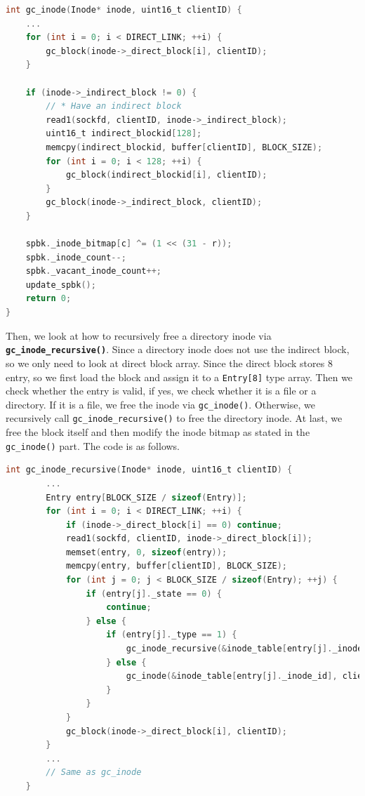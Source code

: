 \begin{lstlisting}[language=C]
int gc_inode(Inode* inode, uint16_t clientID) {
    ... 
    for (int i = 0; i < DIRECT_LINK; ++i) {
        gc_block(inode->_direct_block[i], clientID);
    }

    if (inode->_indirect_block != 0) {
        // * Have an indirect block
        read1(sockfd, clientID, inode->_indirect_block);
        uint16_t indirect_blockid[128];
        memcpy(indirect_blockid, buffer[clientID], BLOCK_SIZE);
        for (int i = 0; i < 128; ++i) {
            gc_block(indirect_blockid[i], clientID);
        }
        gc_block(inode->_indirect_block, clientID);        
    }

    spbk._inode_bitmap[c] ^= (1 << (31 - r));
    spbk._inode_count--;
    spbk._vacant_inode_count++;
    update_spbk();
    return 0;
}
\end{lstlisting}

Then, we look at how to recursively free a directory inode via \textbf{\texttt{gc_inode_recursive()}}. Since
 a directory inode does not use the indirect block, so we only need to look at direct block array. 
Since the direct block stores 8 entry, so we first load the block and assign it to a \texttt{Entry[8]} type array. 
Then we check whether the entry is valid, if yes, we check whether it is a file or a directory. If it is a file, we free the inode via \texttt{gc\_inode()}.
Otherwise, we recursively call \texttt{gc\_inode\_recursive()} to free the directory inode. At last, we free the block itself and then modify the inode bitmap as stated in the \texttt{gc\_inode()} part. The code is as follows.

\begin{lstlisting}[language=C]
    int gc_inode_recursive(Inode* inode, uint16_t clientID) {
        ... 
        Entry entry[BLOCK_SIZE / sizeof(Entry)];
        for (int i = 0; i < DIRECT_LINK; ++i) {
            if (inode->_direct_block[i] == 0) continue;
            read1(sockfd, clientID, inode->_direct_block[i]);
            memset(entry, 0, sizeof(entry));
            memcpy(entry, buffer[clientID], BLOCK_SIZE);
            for (int j = 0; j < BLOCK_SIZE / sizeof(Entry); ++j) {
                if (entry[j]._state == 0) {
                    continue;
                } else {
                    if (entry[j]._type == 1) {
                        gc_inode_recursive(&inode_table[entry[j]._inode_id], clientID);
                    } else {
                        gc_inode(&inode_table[entry[j]._inode_id], clientID);
                    }
                }
            }
            gc_block(inode->_direct_block[i], clientID);
        }
        ... 
        // Same as gc_inode
    }
        
\end{lstlisting}

